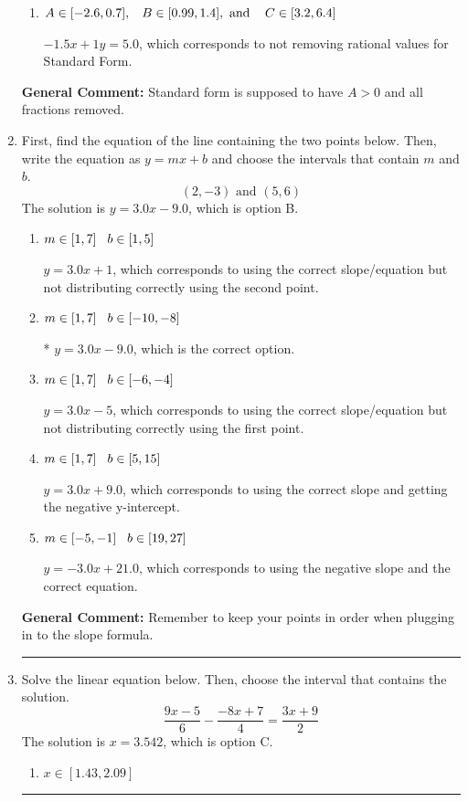 \documentclass{extbook}[14pt]
\newcommand{\litem}[1]{\item #1

\rule{\textwidth}{0.4pt}}
\begin{document}
\begin{enumerate}
{\begin{enumerate}[label=\Alph*.]
 $-1.5x - 1y = -5.0$, which corresponds to using the opposite (negative) slope of the graph and not removing rational values.
\item \( A \in [-2.6, 0.7], \hspace{3mm} B \in [0.99, 1.4], \text{ and } \hspace{3mm} C \in [3.2, 6.4] \)

 $-1.5x + 1y = 5.0$, which corresponds to not removing rational values for Standard Form.
\end{enumerate}

\textbf{General Comment:} Standard form is supposed to have $A > 0$ and all fractions removed.
}
\litem{
First, find the equation of the line containing the two points below. Then, write the equation as $ y=mx+b $ and choose the intervals that contain $m$ and $b$.
\[ (2, -3) \text{ and } (5, 6) \]The solution is \( y = 3.0x -9.0 \), which is option B.\begin{enumerate}[label=\Alph*.]
\item \( m \in [1, 7] \hspace*{3mm} b \in [1, 5] \)

 $y = 3.0x + 1$, which corresponds to using the correct slope/equation but not distributing correctly using the second point.
\item \( m \in [1, 7] \hspace*{3mm} b \in [-10, -8] \)

* $y = 3.0x -9.0$, which is the correct option.
\item \( m \in [1, 7] \hspace*{3mm} b \in [-6, -4] \)

 $y = 3.0x -5$, which corresponds to using the correct slope/equation but not distributing correctly using the first point.
\item \( m \in [1, 7] \hspace*{3mm} b \in [5, 15] \)

 $y = 3.0x + 9.0$, which corresponds to using the correct slope and getting the negative y-intercept.
\item \( m \in [-5, -1] \hspace*{3mm} b \in [19, 27] \)

 $y = -3.0x + 21.0$, which corresponds to using the negative slope and the correct equation.
\end{enumerate}

\textbf{General Comment:} Remember to keep your points in order when plugging in to the slope formula.
}
\litem{
Solve the linear equation below. Then, choose the interval that contains the solution.
\[ \frac{9x -5}{6} - \frac{-8x + 7}{4} = \frac{3x + 9}{2} \]The solution is \( x = 3.542 \), which is option C.\begin{enumerate}[label=\Alph*.]
\item \( x \in [1.43, 2.09] \)


\end{enumerate}}
\end{enumerate}
\end{document}
